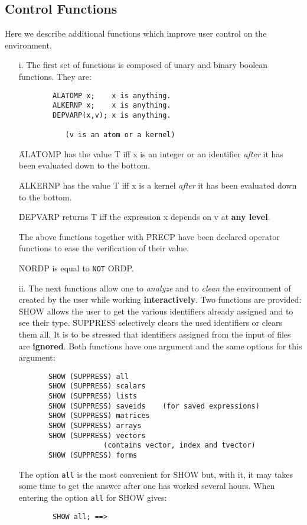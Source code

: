 \subsection{Control Functions}
Here we describe additional functions which
improve user control on the environment.
\begin{itemize}
\item[i.]
The first set of functions is composed of unary and binary boolean functions.
They are:
\begin{verbatim}
        ALATOMP x;    x is anything.
        ALKERNP x;    x is anything.
        DEPVARP(x,v); x is anything.

           (v is an atom or a kernel)
\end{verbatim}
\f{ALATOMP} has the value T iff x is an integer or  an identifier
{\em after} it has been evaluated down to the bottom.

\f{ALKERNP} has the value T iff x is a kernel {\em after}
it has been evaluated down to the bottom.

\f{DEPVARP} returns T iff the expression x depends on v at
{\bf any level}.

The above functions together with \f{PRECP} have
been declared operator functions to ease the verification of
their value.

\f{NORDP} is equal to \verb+NOT+\f{ ORDP}.
\item[ii.]
The next functions allow one to {\em analyze} and to
{\em clean} the environment
of \REDUCE created by the user while working
{\bf interactively}. Two functions are provided:\\
\f{SHOW} allows the user to get the various identifiers already
assigned and to see their type. \f{SUPPRESS} selectively clears the
used identifiers or clears them all. It is to be stressed that identifiers
assigned from the input of files are {\bf ignored}.
Both functions have one argument and the same options for this
argument:
\begin{verbatim}
       SHOW (SUPPRESS) all
       SHOW (SUPPRESS) scalars
       SHOW (SUPPRESS) lists
       SHOW (SUPPRESS) saveids    (for saved expressions)
       SHOW (SUPPRESS) matrices
       SHOW (SUPPRESS) arrays
       SHOW (SUPPRESS) vectors
                    (contains vector, index and tvector)
       SHOW (SUPPRESS) forms
\end{verbatim}
The option \verb+all+ is the most convenient for \f{SHOW} but,
with it, it may
takes some time to get the answer after one has worked several hours.
When entering \REDUCE the option \verb+all+ for \f{SHOW} gives:
\begin{verbatim}
        SHOW all; ==>


\end{verbatim}
\end{itemize}
